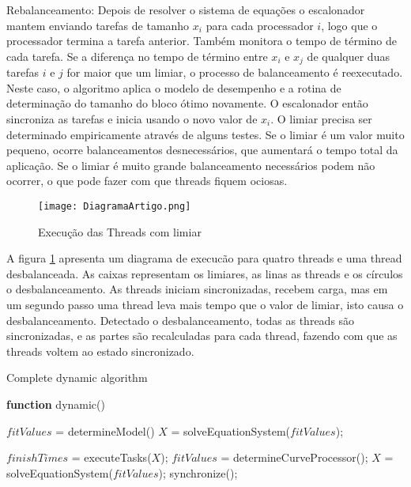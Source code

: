 Rebalanceamento: Depois de resolver o sistema de equações o escalonador mantem enviando tarefas de tamanho $x_i$ para cada processador $i$, logo que o processador termina a tarefa anterior. Também monitora o tempo de término de cada tarefa. Se a diferença no tempo de término entre $x_i$ e $x_j$ de qualquer duas tarefas $i$ e $j$ for maior que um limiar, o processo de balanceamento é reexecutado. Neste caso, o algoritmo aplica o modelo de desempenho e a rotina de determinação do tamanho do bloco ótimo novamente. O escalonador então sincroniza as tarefas e inicia usando o novo valor de $x_i$. O limiar precisa ser determinado empiricamente através de alguns testes. Se o limiar é um valor muito pequeno, ocorre balanceamentos desnecessários, que aumentará o tempo total da aplicação. Se o limiar é muito grande balanceamento necessários podem não ocorrer, o que pode fazer com que threads fiquem ociosas.

\begin{figure}[!t]
	\centering
			\texttt{[image: DiagramaArtigo.png]}
	\caption{Execução das Threads com limiar}
	\label{fig:Diagrama}
\end{figure}

A figura \ref{fig:Diagrama} apresenta um diagrama de execucão para quatro threads e uma thread desbalanceada. As caixas representam os limiares, as linas as threads e os círculos o desbalanceamento. As threads iniciam sincronizadas, recebem carga, mas em um segundo passo uma thread leva mais tempo que o valor de limiar, isto causa o desbalanceamento. Detectado o desbalanceamento, todas as threads são sincronizadas, e as partes são recalculadas para cada thread, fazendo com que as threads voltem ao estado sincronizado.



\begin{algorithm}

\caption{Complete dynamic algorithm}
\label{alg1}

\begin{algorithmic}		

\STATE \textbf{function} dynamic()

\STATE $fitValues$ = determineModel()
\STATE $X$ = solveEquationSystem($fitValues$);


	\STATE $finishTimes$ = executeTasks($X$);
		\STATE $fitValues$ = determineCurveProcessor();
                \STATE $X$ = solveEquationSystem($fitValues$);
                \STATE synchronize();
    	\ENDIF
\ENDWHILE

\end{algorithmic}
\end{algorithm}

